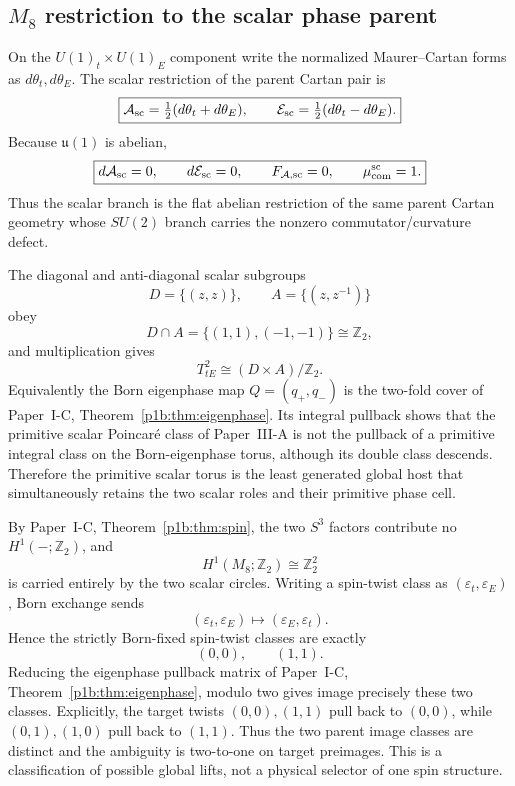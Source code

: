 \documentclass[12pt,a4paper]{article}
\begin{document}
\subsection{$M_8$ restriction to the scalar phase parent}
\label{p3b:sec:v190-m8-scalar-restriction}
On the $U(1)_t\times U(1)_E$ component write the normalized Maurer--Cartan
forms as $d\theta_t,d\theta_E$.  The scalar restriction of the parent Cartan
pair is
\[
 \boxed{\mathcal A_{\rm sc}=\tfrac12(d\theta_t+d\theta_E),\qquad
 \mathcal E_{\rm sc}=\tfrac12(d\theta_t-d\theta_E).}
\]
Because $\mathfrak u(1)$ is abelian,
\[
 \boxed{d\mathcal A_{\rm sc}=0,\qquad
 d\mathcal E_{\rm sc}=0,\qquad
 F_{\mathcal A,{\rm sc}}=0,\qquad
 \mu_{\rm com}^{\rm sc}=1.}
\]
Thus the scalar branch is the flat abelian restriction of the same parent
Cartan geometry whose $SU(2)$ branch carries the nonzero commutator/curvature
defect.

\begin{theorem}
\label{p3b:thm:v190-scalar-eigenphase-host}
The diagonal and anti-diagonal scalar subgroups
\[
 D=\{(z,z)\},\qquad A=\{(z,z^{-1})\}
\]
obey
\[
 D\cap A=\{(1,1),(-1,-1)\}\cong\mathbb Z_2,
\]
and multiplication gives
\[
 \boxed{T^2_{tE}\cong(D\times A)/\mathbb Z_2.}
\]
Equivalently the Born eigenphase map $Q=(q_+,q_-)$ is the two-fold cover
of Paper~I-C, Theorem~\ref{p1b:thm:eigenphase}.  Its integral pullback shows
that the primitive scalar Poincar\'e class of Paper~III-A is not the pullback of a
primitive integral class on the Born-eigenphase torus, although its double
class descends.  Therefore the primitive scalar torus is the least generated
global host that simultaneously retains the two scalar roles and their
primitive phase cell.
\end{theorem}

\begin{corollary}
\label{p3b:cor:v190-scalar-spin-twists}
By Paper~I-C, Theorem~\ref{p1b:thm:spin}, the two $S^3$ factors contribute
no $H^1(-;\mathbb Z_2)$, and
\[
 H^1(M_8;\mathbb Z_2)\cong\mathbb Z_2^2
\]
is carried entirely by the two scalar circles.  Writing a spin-twist class as
$(\varepsilon_t,\varepsilon_E)$, Born exchange sends
\[
 (\varepsilon_t,\varepsilon_E)\longmapsto
 (\varepsilon_E,\varepsilon_t).
\]
Hence the strictly Born-fixed spin-twist classes are exactly
\[
 \boxed{(0,0),\qquad(1,1).}
\]
Reducing the eigenphase pullback matrix of Paper~I-C,
Theorem~\ref{p1b:thm:eigenphase}, modulo two gives image precisely
these two classes.  Explicitly, the target twists \((0,0),(1,1)\) pull back to
\((0,0)\), while \((0,1),(1,0)\) pull back to \((1,1)\).  Thus the two parent
image classes are distinct and the ambiguity is two-to-one on target
preimages.  This is a classification of possible global lifts, not a
physical selector of one spin structure.
\end{corollary}
\end{document}
